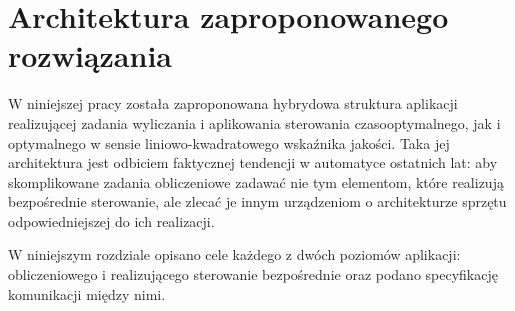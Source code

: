 \chapter{Architektura zaproponowanego rozwiązania}
\label{cha:arch}

W niniejszej pracy została zaproponowana hybrydowa struktura aplikacji realizującej zadania wyliczania i aplikowania sterowania czasooptymalnego, jak i optymalnego w sensie liniowo-kwadratowego wskaźnika jakości.
Taka jej architektura jest odbiciem faktycznej tendencji w automatyce ostatnich lat: aby skomplikowane zadania obliczeniowe zadawać nie tym elementom, które realizują bezpośrednie sterowanie, ale zlecać je innym urządzeniom o architekturze sprzętu odpowiedniejszej do ich realizacji.

W niniejszym rozdziale opisano cele każdego z dwóch poziomów aplikacji: obliczeniowego i realizującego sterowanie bezpośrednie oraz podano specyfikację komunikacji między nimi.





